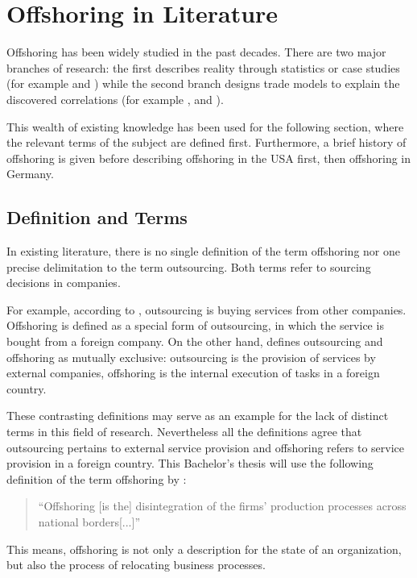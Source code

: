 \section{Offshoring in Literature}
\label{sec:Theory}
Offshoring has been widely studied in the past decades. There are two major branches of research: the first describes reality through statistics or case studies (for example \cite{Rottman.2008} and \cite{Pedersen.2013}) while the second branch designs trade models to explain the discovered correlations (for example \cite{Antras.2004}, \cite{Grossman.2008} and \cite{Helpman.1999}).

This wealth of existing knowledge has been used for the following section, where the relevant terms of the subject are defined first. Furthermore, a brief history of offshoring is given before describing offshoring in the USA first, then offshoring in Germany.

\subsection{Definition and Terms}
\label{sec:DefTerms}
In existing literature, there is no single definition of the term offshoring nor one precise delimitation to the term outsourcing. Both terms refer to sourcing decisions in companies. 

For example, according to \cite[pp. 1f]{Knolmayer.2007}, outsourcing is buying services from other companies. Offshoring is defined as a special form of outsourcing, in which the service is bought from a foreign company. On the other hand, \cite[p. 2]{Alebrand.2013} defines outsourcing and offshoring as mutually exclusive: outsourcing is the provision of services by external companies, offshoring is the internal execution of tasks in a foreign country.

These contrasting definitions may serve as an example for the lack of distinct terms in this field of research. Nevertheless all the definitions agree that outsourcing pertains to external service provision and offshoring refers to service provision in a foreign country. This Bachelor's thesis will use the following definition of the term offshoring by \cite[p. 321]{Andersson.2016}:

\begin{quote}
	``Offshoring [is the] disintegration of the firms’ production processes across national borders[...]''
\end{quote} 

This means, offshoring is not only a description for the state of an organization, but also the process of relocating business processes.

